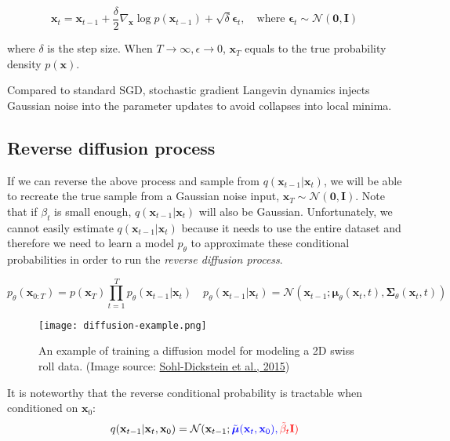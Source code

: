 \documentclass[12pt]{article}
\begin{document}
\[
\mathbf{x}_t = \mathbf{x}_{t-1} + \frac{\delta}{2} \nabla_\mathbf{x} \log p(\mathbf{x}_{t-1}) + \sqrt{\delta} \boldsymbol{\epsilon}_t
,\quad\text{where }
\boldsymbol{\epsilon}_t \sim \mathcal{N}(\mathbf{0}, \mathbf{I})
\]

where $\delta$ is the step size. When $T \to \infty, \epsilon \to 0$, $\mathbf{x}_T$ equals to the true probability density $p(\mathbf{x})$.

Compared to standard SGD, stochastic gradient Langevin dynamics injects Gaussian noise into the parameter updates to avoid collapses into local minima.

\subsection{Reverse diffusion process}

If we can reverse the above process and sample from $q(\mathbf{x}_{t-1} \vert \mathbf{x}_t)$, we will be able to recreate the true sample from a Gaussian noise input, $\mathbf{x}_T \sim \mathcal{N}(\mathbf{0}, \mathbf{I})$. Note that if $\beta_t$ is small enough, $q(\mathbf{x}_{t-1} \vert \mathbf{x}_t)$ will also be Gaussian. Unfortunately, we cannot easily estimate $q(\mathbf{x}_{t-1} \vert \mathbf{x}_t)$ because it needs to use the entire dataset and therefore we need to learn a model $p_\theta$ to approximate these conditional probabilities in order to run the \emph{reverse diffusion process}.

\[
p_\theta(\mathbf{x}_{0:T}) = p(\mathbf{x}_T) \prod^T_{t=1} p_\theta(\mathbf{x}_{t-1} \vert \mathbf{x}_t) \quad
p_\theta(\mathbf{x}_{t-1} \vert \mathbf{x}_t) = \mathcal{N}(\mathbf{x}_{t-1}; \boldsymbol{\mu}_\theta(\mathbf{x}_t, t), \boldsymbol{\Sigma}_\theta(\mathbf{x}_t, t))
\]

\begin{figure}[H]
    \centering
    \texttt{[image: diffusion-example.png]}
    \caption{An example of training a diffusion model for modeling a 2D swiss roll data. (Image source: \href{https://arxiv.org/abs/1503.03585}{Sohl-Dickstein et al., 2015})}
\end{figure}

It is noteworthy that the reverse conditional probability is tractable when conditioned on $\mathbf{x}_0$:
\[
q(\mathbf{x}_{t-1} \vert \mathbf{x}_t, \mathbf{x}_0) = \mathcal{N}(\mathbf{x}_{t-1}; \color{blue}{\tilde{\boldsymbol{\mu}}}(\mathbf{x}_t, \mathbf{x}_0), \color{red}{\tilde{\beta}_t} \mathbf{I})
\]
\end{document}
